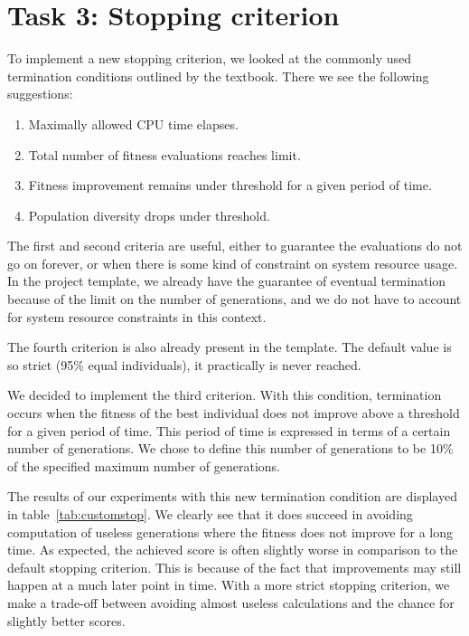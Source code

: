 \documentclass{report}
\begin{document}
\section{Task 3: Stopping criterion}
\label{sec:stopping_criterion}
To implement a new stopping criterion, we looked at the commonly used termination conditions outlined by the textbook. There we see the following suggestions:
\begin{enumerate}
	\item Maximally allowed CPU time elapses.
	\item Total number of fitness evaluations reaches limit.
	\item Fitness improvement remains under threshold for a given period of time.
	\item Population diversity drops under threshold.
\end{enumerate}
The first and second criteria are useful, either to guarantee the evaluations do not go on forever, or when there is some kind of constraint on system resource usage. In the project template, we already have the guarantee of eventual termination because of the limit on the number of generations, and we do not have to account for system resource constraints in this context.

The fourth criterion is also already present in the template. The default value is so strict (95\% equal individuals), it practically is never reached.

We decided to implement the third criterion. With this condition, termination occurs when the fitness of the best individual does not improve above a threshold for a given period of time. This period of time is expressed in terms of a certain number of generations. We chose to define this number of generations to be 10\% of the specified maximum number of generations.

The results of our experiments with this new termination condition are displayed in table~\ref{tab:customstop}. We clearly see that it does succeed in avoiding computation of useless generations where the fitness does not improve for a long time. As expected, the achieved score is often slightly worse in comparison to the default stopping criterion. This is because of the fact that improvements may still happen at a much later point in time. With a more strict stopping criterion, we make a trade-off between avoiding almost useless calculations and the chance for slightly better scores.


\newpage
\end{document}
